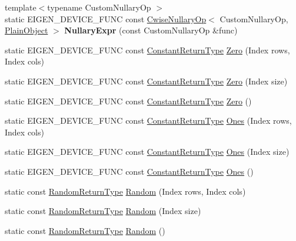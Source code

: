 \begin{DoxyCompactItemize}
{\footnotesize template$<$typename Custom\+Nullary\+Op $>$ }\\static E\+I\+G\+E\+N\+\_\+\+D\+E\+V\+I\+C\+E\+\_\+\+F\+U\+NC const \mbox{\hyperlink{class_eigen_1_1_cwise_nullary_op}{Cwise\+Nullary\+Op}}$<$ Custom\+Nullary\+Op, \mbox{\hyperlink{class_eigen_1_1_dense_base_aae45af9b5aca5a9caae98fd201f47cc4}{Plain\+Object}} $>$ {\bfseries Nullary\+Expr} (const Custom\+Nullary\+Op \&func)
\item 
static E\+I\+G\+E\+N\+\_\+\+D\+E\+V\+I\+C\+E\+\_\+\+F\+U\+NC const \mbox{\hyperlink{class_eigen_1_1_cwise_nullary_op}{Constant\+Return\+Type}} \mbox{\hyperlink{class_eigen_1_1_dense_base_a3832aa9b2ee9ebdb4458003c742c9027}{Zero}} (Index rows, Index cols)
\item 
static E\+I\+G\+E\+N\+\_\+\+D\+E\+V\+I\+C\+E\+\_\+\+F\+U\+NC const \mbox{\hyperlink{class_eigen_1_1_cwise_nullary_op}{Constant\+Return\+Type}} \mbox{\hyperlink{class_eigen_1_1_dense_base_a55794ebb0c1cba3b998063a45b18378c}{Zero}} (Index size)
\item 
static E\+I\+G\+E\+N\+\_\+\+D\+E\+V\+I\+C\+E\+\_\+\+F\+U\+NC const \mbox{\hyperlink{class_eigen_1_1_cwise_nullary_op}{Constant\+Return\+Type}} \mbox{\hyperlink{class_eigen_1_1_dense_base_a8c4be762b10041d64a2b2ce85bb14ba0}{Zero}} ()
\item 
static E\+I\+G\+E\+N\+\_\+\+D\+E\+V\+I\+C\+E\+\_\+\+F\+U\+NC const \mbox{\hyperlink{class_eigen_1_1_cwise_nullary_op}{Constant\+Return\+Type}} \mbox{\hyperlink{class_eigen_1_1_dense_base_adb1ce2c904a1eb3f3bab81ced1b916b6}{Ones}} (Index rows, Index cols)
\item 
static E\+I\+G\+E\+N\+\_\+\+D\+E\+V\+I\+C\+E\+\_\+\+F\+U\+NC const \mbox{\hyperlink{class_eigen_1_1_cwise_nullary_op}{Constant\+Return\+Type}} \mbox{\hyperlink{class_eigen_1_1_dense_base_aef6ca489dc447631fe874c8071ee7edd}{Ones}} (Index size)
\item 
static E\+I\+G\+E\+N\+\_\+\+D\+E\+V\+I\+C\+E\+\_\+\+F\+U\+NC const \mbox{\hyperlink{class_eigen_1_1_cwise_nullary_op}{Constant\+Return\+Type}} \mbox{\hyperlink{class_eigen_1_1_dense_base_a1284a38971d817c33e40c226f6347e37}{Ones}} ()
\item 
static const \mbox{\hyperlink{class_eigen_1_1_cwise_nullary_op}{Random\+Return\+Type}} \mbox{\hyperlink{class_eigen_1_1_dense_base_ae97f8d9d08f969c733c8144be6225756}{Random}} (Index rows, Index cols)
\item 
static const \mbox{\hyperlink{class_eigen_1_1_cwise_nullary_op}{Random\+Return\+Type}} \mbox{\hyperlink{class_eigen_1_1_dense_base_a7eb5f974a8f0b67eac7080db1da0e308}{Random}} (Index size)
\item 
static const \mbox{\hyperlink{class_eigen_1_1_cwise_nullary_op}{Random\+Return\+Type}} \mbox{\hyperlink{class_eigen_1_1_dense_base_ae814abb451b48ed872819192dc188c19}{Random}} ()
\end{DoxyCompactItemize}
